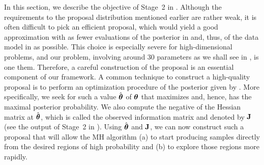 In this section, we describe the objective of Stage~2 in .
Although the requirements to the proposal distribution mentioned earlier are rather weak, it is often difficult to pick an efficient proposal, which would yield a good approximation with as fewer evaluations of the posterior in  and, thus, of the data model in  as possible.
This choice is especially severe for high-dimensional problems, and our problem, involving around 30 parameters as we shall see in , is one them.
Therefore, a careful construction of the proposal is an essential component of our framework.
A common technique to construct a high-quality proposal is to perform an optimization procedure of the posterior given by .
More specifically, we seek for such a value $\hat{{\boldsymbol\theta}}$ of ${\boldsymbol\theta}$ that maximizes  and, hence, has the maximal posterior probability.
We also compute the negative of the Hessian matrix at $\hat{{\boldsymbol\theta}}$, which is called the observed information matrix and denoted by $\mathbf{J}$ (see the output of Stage~2 in ).
Using $\hat{{\boldsymbol\theta}}$ and $\mathbf{J}$, we can now construct such a proposal that will allow the MH algorithm (a) to start producing samples directly from the desired regions of high probability and (b) to explore those regions more rapidly.
